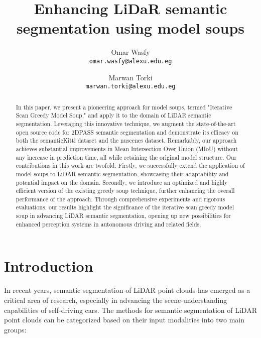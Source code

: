 \documentclass[10pt,twocolumn,letterpaper]{article}
\begin{document}
	
	\title{Enhancing LiDaR semantic segmentation using model soups }
	
	\author{ Omar Wasfy\\
		{\tt\small omar.wasfy@alexu.edu.eg}
	\and
	Marwan Torki\\
	{\tt\small marwan.torki@alexu.edu.eg}
}
\maketitle

\begin{abstract}
	In this paper, we present a pioneering approach for model soups, termed "Iterative Scan Greedy Model Soup," and apply it to the domain of LiDAR semantic segmentation. Leveraging this innovative technique, we augment the state-of-the-art open source code for 2DPASS semantic segmentation and demonstrate its efficacy on both the semanticKitti dataset and the nuscenes dataset. Remarkably, our approach achieves substantial improvements in Mean Intersection Over Union (MIoU) without any increase in prediction time, all while retaining the original model structure.	Our contributions in this work are twofold: Firstly, we successfully extend the application of model soups to LiDAR semantic segmentation, showcasing their adaptability and potential impact on the domain. Secondly, we introduce an optimized and highly efficient version of the existing greedy soup technique, further enhancing the overall performance of the approach. Through comprehensive experiments and rigorous evaluations, our results highlight the significance of the iterative scan greedy model soup in advancing LiDAR semantic segmentation, opening up new possibilities for enhanced perception systems in autonomous driving and related fields.
\end{abstract}

\section{Introduction}
\label{sec:intro}

In recent years, semantic segmentation of LiDAR point clouds has emerged as a critical area of research, especially in advancing the scene-understanding capabilities of self-driving cars. The methods for semantic segmentation of LiDAR point clouds can be categorized based on their input modalities into two main groups:
\end{document}
